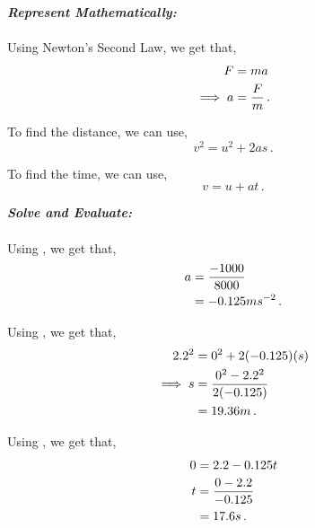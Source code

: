 \begin{subquestions}
\begin{subsubquestions}
\textbf{\textit{Represent Mathematically:}} \\ \\ 
Using Newton's Second Law, we get that,
\begin{align}
	F & = ma \nonumber \\
	\implies a & = \frac{F}{m} \label{2008J:q5:AEqn1} \,.
\end{align}

To find the distance, we can use,
\begin{equation}
	v^2 = u^2 + 2as \label{2008J:q5:SEqn1} \,.
\end{equation}

To find the time, we can use,
\begin{equation}
	v = u+at \label{2008J:q5:TEqn1} \,.
\end{equation}




\textbf{\textit{Solve and Evaluate:}} \\ \\
Using , we get that,
\begin{align}
	a & = \frac{-1000}{8000} \nonumber \\
	  & = -0.125ms^{-2} \,. 
\end{align}

Using , we get that,
\begin{align}
	2.2^2 & = 0^2 + 2(-0.125)(s) \nonumber \\
	\implies s & = \frac{0^2-2.2^2}{2(-0.125)} \nonumber \\
	  & = 19.36m \,.
\end{align}

Using , we get that,
\begin{align}
	0 & = 2.2 - 0.125t \nonumber \\
	t & = \frac{0-2.2}{-0.125} \nonumber \\
	  & = 17.6s \,.
\end{align}

\end{subsubquestions}
	
\end{subquestions}